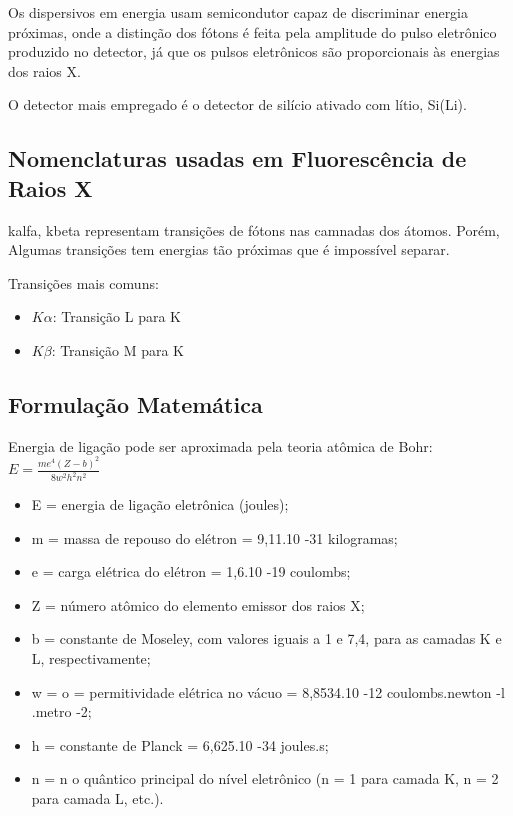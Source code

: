 Os dispersivos em energia usam semicondutor capaz de discriminar energia 
próximas, onde a distinção dos fótons é feita pela amplitude do pulso 
eletrônico produzido no detector, já que os pulsos eletrônicos são
proporcionais às energias dos raios X. 

O detector mais empregado é o detector de silício ativado com lítio, Si(Li).

\subsection{Nomenclaturas usadas em Fluorescência de Raios X}
kalfa, kbeta representam transições de fótons nas camnadas dos átomos.
Porém, Algumas transições tem energias tão próximas que é impossível separar.

Transições mais comuns:
\begin{itemize}
  \item $K\alpha$: Transição L para K
  \item $K\beta$: Transição M para K
\end{itemize}


\subsection{Formulação Matemática}

Energia de ligação pode ser aproximada pela teoria atômica de Bohr:
\begin{math}
E = \frac{me^4(Z-b)^2}{8w^2h^2n^2}
\end{math}

\begin{itemize}
  \item E = energia de ligação eletrônica (joules);
  \item m = massa de repouso do elétron = 9,11.10 -31 kilogramas;
  \item e = carga elétrica do elétron = 1,6.10 -19 coulombs;
  \item Z = número atômico do elemento emissor dos raios X;
  \item b = constante de Moseley, com valores iguais a 1 e 7,4, 
        para as camadas K e L, respectivamente;
  \item w = o = permitividade elétrica no vácuo = 8,8534.10 -12 
        coulombs.newton -l .metro -2;
  \item h = constante de Planck = 6,625.10 -34 joules.s;
  \item n = n o quântico principal do nível eletrônico 
        (n = 1 para camada K, n = 2 para camada L, etc.).
\end{itemize}

